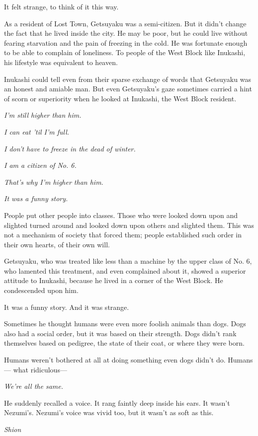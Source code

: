 It felt strange, to think of it this way.

As a resident of Lost Town, Getsuyaku was a semi-citizen. But it didn't
change the fact that he lived inside the city. He may be poor, but he
could live without fearing starvation and the pain of freezing in the
cold. He was fortunate enough to be able to complain of loneliness. To
people of the West Block like Inukashi, his lifestyle was equivalent to
heaven.

Inukashi could tell even from their sparse exchange of words that
Getsuyaku was an honest and amiable man. But even Getsuyaku's gaze
sometimes carried a hint of scorn or superiority when he looked at
Inukashi, the West Block resident.

\emph{I'm still higher than him.}

\emph{I can eat 'til I'm full.}

\emph{I don't have to freeze in the dead of winter.}

\emph{I am a citizen of No. 6.}

\emph{That's why I'm higher than him.}

\emph{It was a funny story.}

People put other people into classes. Those who were looked down upon
and slighted turned around and looked down upon others and slighted
them. This was not a mechanism of society that forced them; people
established such order in their own hearts, of their own will.

Getsuyaku, who was treated like less than a machine by the upper class
of No. 6, who lamented this treatment, and even complained about it,
showed a superior attitude to Inukashi, because he lived in a corner of
the West Block. He condescended upon him.

It was a funny story. And it was strange.

Sometimes he thought humans were even more foolish animals than dogs.
Dogs also had a social order, but it was based on their strength. Dogs
didn't rank themselves based on pedigree, the state of their coat, or
where they were born.

Humans weren't bothered at all at doing something even dogs didn't do.
Humans--- what ridiculous---

\emph{We're all the same.}

He suddenly recalled a voice. It rang faintly deep inside his ears. It
wasn't Nezumi's. Nezumi's voice was vivid too, but it wasn't as soft as
this.

\emph{Shion\el }

